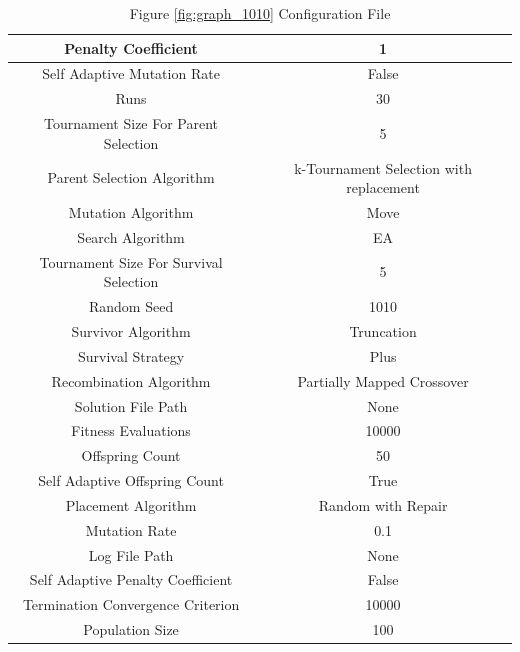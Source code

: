 \documentclass{standalone}
\begin{document}
\begin{table}[!htb]
	\centering
	\caption{Figure \ref{fig:graph_1010} Configuration File}
	\label{tab:graph_1010}
	\begin{tabular}{| c | c |}
		\hline
		Penalty Coefficient		& 1		 \\
		\hline
		Self Adaptive Mutation Rate		& False		 \\
		\hline
		Runs		& 30		 \\
		\hline
		Tournament Size For Parent Selection		& 5		 \\
		\hline
		Parent Selection Algorithm		& k-Tournament Selection with replacement		 \\
		\hline
		Mutation Algorithm		& Move		 \\
		\hline
		Search Algorithm		& EA		 \\
		\hline
		Tournament Size For Survival Selection		& 5		 \\
		\hline
		Random Seed		& 1010		 \\
		\hline
		Survivor Algorithm		& Truncation		 \\
		\hline
		Survival Strategy		& Plus		 \\
		\hline
		Recombination Algorithm		& Partially Mapped Crossover		 \\
		\hline
		Solution File Path		& None		 \\
		\hline
		Fitness Evaluations		& 10000		 \\
		\hline
		Offspring Count		& 50		 \\
		\hline
		Self Adaptive Offspring Count		& True		 \\
		\hline
		Placement Algorithm		& Random with Repair		 \\
		\hline
		Mutation Rate		& 0.1		 \\
		\hline
		Log File Path		& None		 \\
		\hline
		Self Adaptive Penalty Coefficient		& False		 \\
		\hline
		Termination Convergence Criterion		& 10000		 \\
		\hline
		Population Size		& 100		 \\
		\hline
	\end{tabular}
\end{table}
\end{document}
